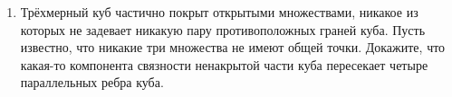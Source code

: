 \documentclass[12pt]{article}
\def\RR{\mathbb{R}}
\begin{document}
\begin{enumerate}
%



%

%

  \item Трёхмерный куб частично покрыт открытыми множествами, никакое из которых не задевает никакую пару противоположных граней куба. Пусть известно, что никакие три множества не имеют общей точки. Докажите, что какая-то компонента связности ненакрытой части куба пересекает четыре параллельных ребра куба.


\end{enumerate}
\end{document}
